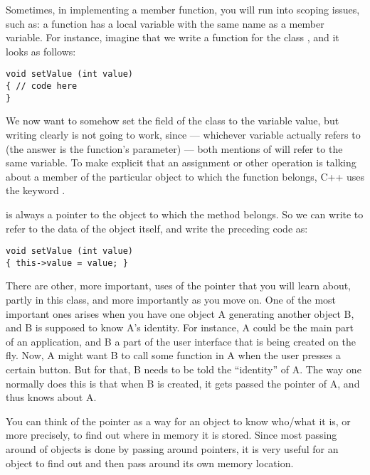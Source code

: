Sometimes, in implementing a member function, you will run into
scoping issues, such as:
a function has a local variable with the same name as a member variable.
For instance, imagine that we write a  function for the
class , and it looks as follows:
\begin{verbatim}
void setValue (int value)
{ // code here
}
\end{verbatim}
We now want to somehow set the  field of the class to the
variable value, but writing  clearly is not going to
work, since --- whichever variable  actually refers to (the
answer is the function's parameter) --- both mentions of 
will refer to the same variable.
To make explicit that an assignment or other operation is talking
about a member of the particular object to which the function belongs,
C++ uses the keyword . 

 is always a pointer to the object to which the method
belongs. So we can write  to refer to the data of the
object itself, and write the preceding code as:
\begin{verbatim}
void setValue (int value)
{ this->value = value; }
\end{verbatim}

There are other, more important, uses of the  pointer that
you will learn about, partly in this class, and more importantly as
you move on. One of the most important ones arises when you have one
object A generating another object B, and B is supposed to know A's
identity. For instance, A could be the main part of an application,
and B a part of the user interface that is being created on the fly. 
Now, A might want B to call some function in A when the user presses a
certain button. But for that, B needs to be told the ``identity'' of
A. The way one normally does this is that when B is created, it gets
passed the  pointer of A, and thus knows about A.

You can think of the  pointer as a way for an object to
know who/what it is, or more precisely, to find out where in memory it
is stored. Since most passing around of objects is done by passing
around pointers, it is very useful for an object to find out and then
pass around its own memory location.
